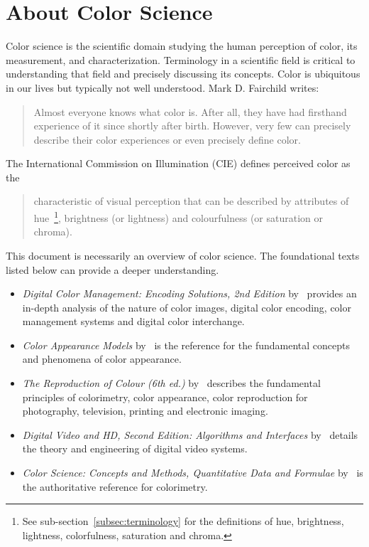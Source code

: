 \section{About Color Science}
\label{sec:about-color-science}

Color science is the scientific domain studying the human perception of color,
its measurement, and characterization. Terminology in a scientific field is
critical to understanding that field and precisely discussing its concepts.
Color is ubiquitous in our lives but typically not well understood.
\ccpar{}
Mark D. Fairchild writes:~\blockcquote[85]{Fairchild2013u}{Almost everyone
knows what color is. After all, they have had firsthand experience of it since
shortly after birth. However, very few can precisely describe their color
experiences or even precisely define color.}
\ccpar{}
The International Commission on Illumination (CIE) defines perceived color as
the~\blockcquote{CIEbk}{characteristic of visual perception that can be
described by attributes of hue~\footnote{See sub-section~\ref{subsec:terminology}
for the definitions of hue, brightness, lightness, colorfulness, saturation and
chroma.}, brightness (or lightness) and colourfulness (or saturation or
chroma).}
\ccpar{}
This document is necessarily an overview of color science. The foundational
texts listed below can provide a deeper understanding.
\begin{itemize}
    \item \textit{Digital Color Management: Encoding Solutions, 2nd Edition}
by~\textcite{Madden2007} provides an in-depth analysis of the nature of color
images, digital color encoding, color management systems and digital color
interchange.
    \item \textit{Color Appearance Models}
by~\textcite{Fairchild2013u} is the reference for the fundamental concepts and
phenomena of color appearance.
    \item \textit{The Reproduction of Colour (6th ed.)}
by~\textcite{Hunt2004b} describes the fundamental principles of colorimetry,
color appearance, color reproduction for photography, television, printing and
electronic imaging.
    \item \textit{Digital Video and HD, Second Edition: Algorithms and Interfaces}
by~\textcite{Poynton2012} details the theory and engineering of digital video
systems.
    \item \textit{Color Science: Concepts and Methods, Quantitative Data and Formulae}
by~\textcite{Wyszecki2000bi} is the authoritative reference for colorimetry.
\end{itemize}

